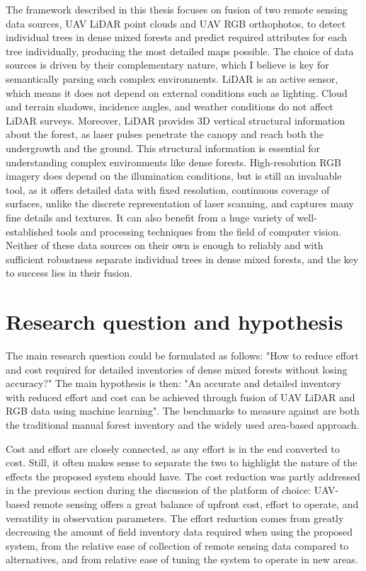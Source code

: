 The framework described in this thesis focuses on fusion of two remote sensing data sources, UAV LiDAR point clouds and UAV RGB orthophotos, to detect individual trees in dense mixed forests and predict required attributes for each tree individually, producing the most detailed maps possible.
The choice of data sources is driven by their complementary nature, which I believe is key for semantically parsing such complex environments.
LiDAR is an active sensor, which means it does not depend on external conditions such as lighting.
Cloud and terrain shadows, incidence angles, and weather conditions do not affect LiDAR surveys.
Moreover, LiDAR provides 3D vertical structural information about the forest, as laser pulses penetrate the canopy and reach both the undergrowth and the ground.
This structural information is essential for understanding complex environments like dense forests.
High-resolution RGB imagery does depend on the illumination conditions, but is still an invaluable tool, as it offers detailed data with fixed resolution, continuous coverage of surfaces, unlike the discrete representation of laser scanning, and captures many fine details and textures.
It can also benefit from a huge variety of well-established tools and processing techniques from the field of computer vision.
Neither of these data sources on their own is enough to reliably and with sufficient robustness separate individual trees in dense mixed forests, and the key to success lies in their fusion.

\section{Research question and hypothesis}\label{sec-research-question}

The main research question could be formulated as follows: "How to reduce effort and cost required for detailed inventories of dense mixed forests without losing accuracy?"
The main hypothesis is then: "An accurate and detailed inventory with reduced effort and cost can be achieved through fusion of UAV LiDAR and RGB data using machine learning".
The benchmarks to measure against are both the traditional manual forest inventory and the widely used area-based approach.

Cost and effort are closely connected, as any effort is in the end converted to cost.
Still, it often makes sense to separate the two to highlight the nature of the effects the proposed system should have.
The cost reduction was partly addressed in the previous section during the discussion of the platform of choice: UAV-based remote sensing offers a great balance of upfront cost, effort to operate, and versatility in observation parameters.
The effort reduction comes from greatly decreasing the amount of field inventory data required when using the proposed system, from the relative ease of collection of remote sensing data compared to alternatives, and from relative ease of tuning the system to operate in new areas.

